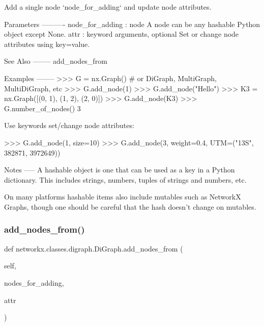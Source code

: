 \begin{DoxyVerb}Add a single node `node_for_adding` and update node attributes.

Parameters
----------
node_for_adding : node
    A node can be any hashable Python object except None.
attr : keyword arguments, optional
    Set or change node attributes using key=value.

See Also
--------
add_nodes_from

Examples
--------
>>> G = nx.Graph()  # or DiGraph, MultiGraph, MultiDiGraph, etc
>>> G.add_node(1)
>>> G.add_node("Hello")
>>> K3 = nx.Graph([(0, 1), (1, 2), (2, 0)])
>>> G.add_node(K3)
>>> G.number_of_nodes()
3

Use keywords set/change node attributes:

>>> G.add_node(1, size=10)
>>> G.add_node(3, weight=0.4, UTM=("13S", 382871, 3972649))

Notes
-----
A hashable object is one that can be used as a key in a Python
dictionary. This includes strings, numbers, tuples of strings
and numbers, etc.

On many platforms hashable items also include mutables such as
NetworkX Graphs, though one should be careful that the hash
doesn't change on mutables.
\end{DoxyVerb}
 \mbox{\label{classnetworkx_1_1classes_1_1digraph_1_1DiGraph_adf4b6877599ad1dbe4cbe6ff7bd88d02}} 
\subsubsection{\texorpdfstring{add\+\_\+nodes\+\_\+from()}{add\_nodes\_from()}}
{\footnotesize\ttfamily def networkx.\+classes.\+digraph.\+Di\+Graph.\+add\+\_\+nodes\+\_\+from (\begin{DoxyParamCaption}\item[{}]{self,  }\item[{}]{nodes\+\_\+for\+\_\+adding,  }\item[{}]{attr }\end{DoxyParamCaption})}

